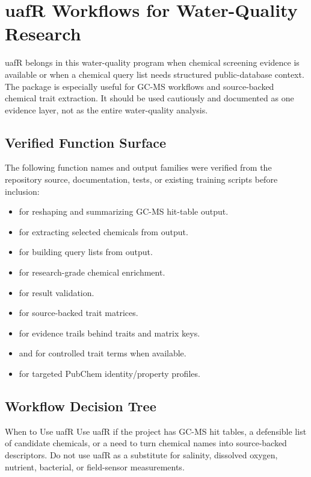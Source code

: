 \chapter{uafR Workflows for Water-Quality Research}

uafR belongs in this water-quality program when chemical screening evidence is available or when a chemical query list needs structured public-database context. The package is especially useful for GC-MS workflows and source-backed chemical trait extraction. It should be used cautiously and documented as one evidence layer, not as the entire water-quality analysis.

\section{Verified Function Surface}

The following function names and output families were verified from the repository source, documentation, tests, or existing training scripts before inclusion:
\begin{itemize}
  \item {} for reshaping and summarizing GC-MS hit-table output.
  \item {} for extracting selected chemicals from  output.
  \item {} for building query lists from  output.
  \item {} for research-grade chemical enrichment.
  \item {} for result validation.
  \item {} for source-backed trait matrices.
  \item {} for evidence trails behind traits and matrix keys.
  \item {} and  for controlled trait terms when available.
  \item {} for targeted PubChem identity/property profiles.
\end{itemize}

\section{Workflow Decision Tree}

\begin{programbox}{When to Use uafR}
Use uafR if the project has GC-MS hit tables, a defensible list of candidate chemicals, or a need to turn chemical names into source-backed descriptors. Do not use uafR as a substitute for salinity, dissolved oxygen, nutrient, bacterial, or field-sensor measurements.
\end{programbox}

